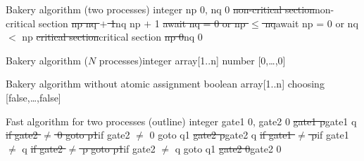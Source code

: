 \begin{wideslide}[bm=,toc=]{\large }
\begin{alg}{Bakery algorithm (two processes)}%
{integer np \la{} 0, nq \la{} 0}\hline
{}
\st{\idt{}non-critical section}{\idt{}non-critical section}
\st{\idt{}np \la{} nq $+$ 1}{\idt{}nq \la{} np $+$ 1}
\st{\idt{}await nq = 0 or np $\le$ nq}{\idt{}await np = 0 or nq $<$ np}
\st{\idt{}critical section}{\idt{}critical section}
\st{\idt{}np \la{} 0}{\idt{}nq \la{} 0}
\end{alg}
\end{wideslide}

\begin{wideslide}[bm=,toc=]{\large }
\begin{alg}{Bakery algorithm ($N$ processes)}{integer array[1..n] number \la{} [0,\ldots,0]}\hline
{}
\end{alg}
\end{wideslide}

\begin{wideslide}[bm=,toc=]{\large }
\begin{alg}{Bakery algorithm without atomic assignment}%
{boolean array[1..n] choosing \la{} [false,\ldots,false]}
\hline
{}
\end{alg}
\end{wideslide}

\begin{wideslide}[bm=,toc=]{\large }
\begin{alg}{Fast algorithm for two processes (outline)}%
{integer gate1 \la{} 0, gate2 \la{} 0}\hline
{}
\st{\idt{}gate1 \la{} p}{\idt{}gate1 \la{} q}
\st{\idt{}if gate2 $\neq$ 0 goto p1}{\idt{}if gate2 $\neq$ 0 goto q1}
\st{\idt{}gate2 \la{} p}{\idt{}gate2 \la{} q}
\st{\idt{}if gate1 $\neq$ p}{\idt{}if gate1 $\neq$ q}
\st{\idt{}\idt{}if gate2 $\neq$ p goto p1}{\idt{}\idt{}if gate2 $\neq$ q goto q1}
\st{\idt{}gate2 \la{} 0}{\idt{}gate2 \la{} 0}
\end{alg}
\end{wideslide}

